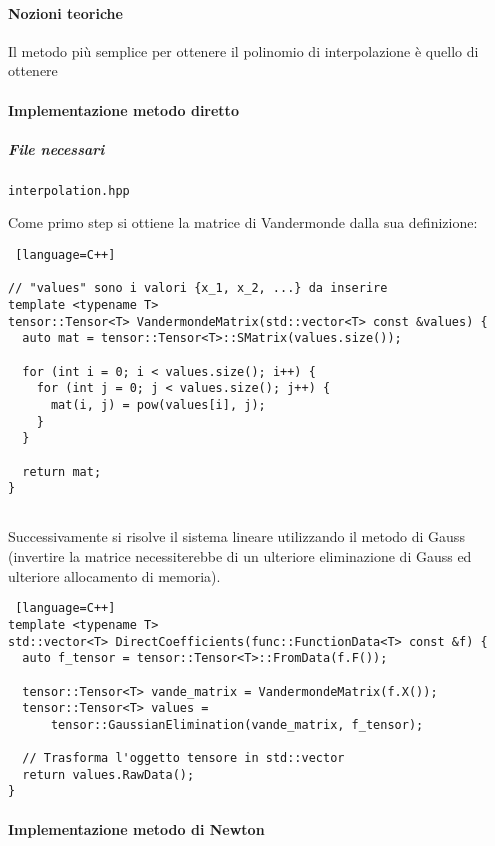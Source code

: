 \paragraph{Nozioni teoriche}

Il metodo più semplice per ottenere il polinomio di interpolazione è quello di ottenere


\paragraph{Implementazione metodo diretto}

\subparagraph{File necessari} \texttt{interpolation.hpp}

Come primo step si ottiene la matrice di Vandermonde dalla sua definizione:

\begin{lstlisting} [language=C++]

// "values" sono i valori {x_1, x_2, ...} da inserire 
template <typename T>
tensor::Tensor<T> VandermondeMatrix(std::vector<T> const &values) {
  auto mat = tensor::Tensor<T>::SMatrix(values.size());

  for (int i = 0; i < values.size(); i++) {
    for (int j = 0; j < values.size(); j++) {
      mat(i, j) = pow(values[i], j);
    }
  }

  return mat;
}
    
\end{lstlisting}

Successivamente si risolve il sistema lineare utilizzando il metodo di Gauss
(invertire la matrice necessiterebbe di un ulteriore eliminazione di Gauss ed
ulteriore allocamento di memoria).

\begin{lstlisting} [language=C++]
template <typename T>
std::vector<T> DirectCoefficients(func::FunctionData<T> const &f) {
  auto f_tensor = tensor::Tensor<T>::FromData(f.F());

  tensor::Tensor<T> vande_matrix = VandermondeMatrix(f.X());
  tensor::Tensor<T> values =
      tensor::GaussianElimination(vande_matrix, f_tensor);

  // Trasforma l'oggetto tensore in std::vector
  return values.RawData();
}

\end{lstlisting}

\paragraph{Implementazione metodo di Newton}

